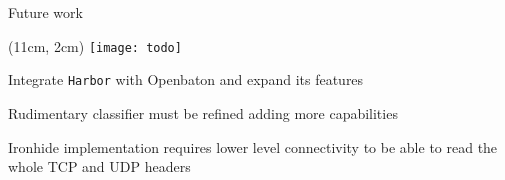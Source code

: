 \begin{frame}{Future work}

  \begin{textblock*}{1cm}(11cm, 2cm)
    \texttt{[image: todo]}
  \end{textblock*}

  Integrate \texttt{Harbor} with Openbaton and expand its features

  \vfill{}

  Rudimentary classifier must be refined adding more capabilities

  \vfill{}

  Ironhide implementation requires lower level connectivity to be able to read
  the whole TCP and UDP headers

  \vfill{}

\end{frame}